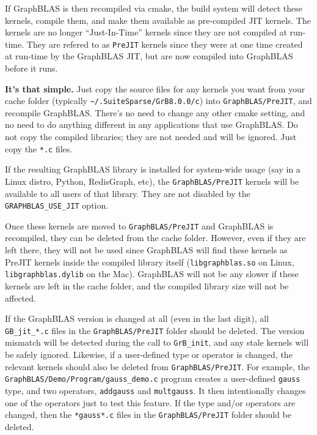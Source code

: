 \documentclass[12pt]{article}
\begin{document}
If GraphBLAS is then recompiled via cmake, the build system will detect these
kernels, compile them, and make them available as pre-compiled JIT kernels.
The kernels are no longer ``Just-In-Time'' kernels since they are not compiled
at run-time.  They are refered to as \verb'PreJIT' kernels since they were at
one time created at run-time by the GraphBLAS JIT, but are now compiled into
GraphBLAS before it runs.

{\bf It's that simple.}  Just copy the source files for any kernels you want
from your cache folder (typically \verb'~/.SuiteSparse/GrB8.0.0/c') into
\verb'GraphBLAS/PreJIT', and recompile GraphBLAS.  There's no need to change
any other cmake setting, and no need to do anything different in any
applications that use GraphBLAS.  Do not copy the compiled libraries; they are
not needed and will be ignored.  Just copy the \verb'*.c' files.

If the resulting GraphBLAS library is installed for system-wide usage (say in a
Linux distro, Python, RedisGraph, etc), the \verb'GraphBLAS/PreJIT' kernels
will be available to all users of that library.  They are not disabled by the
\verb'GRAPHBLAS_USE_JIT' option.

Once these kernels are moved to \verb'GraphBLAS/PreJIT' and GraphBLAS is
recompiled, they can be deleted from the cache folder.  However, even if they
are left there, they will not be used since GraphBLAS will find these kernels
as PreJIT kernels inside the compiled library itself (\verb'libgraphblas.so' on
Linux, \verb'libgraphblas.dylib' on the Mac).  GraphBLAS will not be any slower
if these kernels are left in the cache folder, and the compiled library size
will not be affected.

If the GraphBLAS version is changed at all (even in the last digit), all
\verb'GB_jit_*.c' files in the \verb'GraphBLAS/PreJIT' folder should be
deleted.  The version mismatch will be detected during the call to
\verb'GrB_init', and any stale kernels will be safely ignored.  Likewise, if a
user-defined type or operator is changed, the relevant kernels should also be
deleted from \verb'GraphBLAS/PreJIT'.  For example, the
\verb'GraphBLAS/Demo/Program/gauss_demo.c' program creates a user-defined
\verb'gauss' type, and two operators, \verb'addgauss' and \verb'multgauss'.  It
then intentionally changes one of the operators just to test this feature.  If
the type and/or operators are changed, then the \verb'*gauss*.c' files in the
\verb'GraphBLAS/PreJIT' folder should be deleted.
\end{document}
